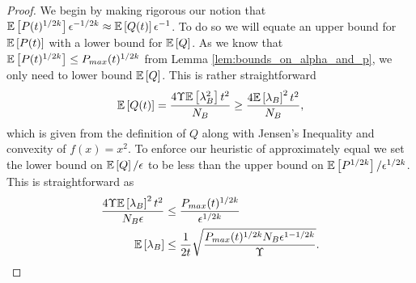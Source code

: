 \begin{proof}
We begin by making rigorous our notion that $\mathbb{E}\left[ P(t)^{1/2k} \right] \epsilon^{-1/2k} \approx \mathbb{E}\left[ Q(t) \right] \epsilon^{-1}$. To do so we will equate an upper bound for $\mathbb{E}\left[ P(t) \right]$ with a lower bound for $\mathbb{E}\left[ Q \right]$. As we know that $\mathbb{E}\left[ P(t)^{1/2k} \right] \leq P_{max}(t)^{1/2k}$ from Lemma \ref{lem:bounds_on_alpha_and_p}, we only need to lower bound $\mathbb{E}\left[ Q \right]$. This is rather straightforward
\begin{equation}
    \mathbb{E}\left[ Q(t) \right] = \frac{4 \Upsilon \mathbb{E}\left[ \lambda_B^2 \right] t^2}{N_B} \geq \frac{4 \mathbb{E}\left[ \lambda_B \right]^2 t^2}{N_B}, 
\end{equation}
which is given from the definition of $Q$ along with Jensen's Inequality and convexity of $f(x) = x^2$. To enforce our heuristic of approximately equal we set the lower bound on $\mathbb{E}\left[ Q \right]/\epsilon$ to be less than the upper bound on $\mathbb{E}\left[ P^{1/2k} \right]/\epsilon^{1/2k}$. This is straightforward as
\begin{align}
    \frac{4 \Upsilon \mathbb{E}\left[ \lambda_B \right]^2 t^2}{N_B \epsilon} &\leq \frac{P_{max}(t)^{1/2k}}{\epsilon^{1/2k}} \\
    \mathbb{E}\left[ \lambda_B \right] &\leq \frac{1}{2t} \sqrt{\frac{P_{max}(t)^{1/2k} N_B \epsilon^{1-1/2k} } {\Upsilon} } .
\end{align}


\end{proof}
